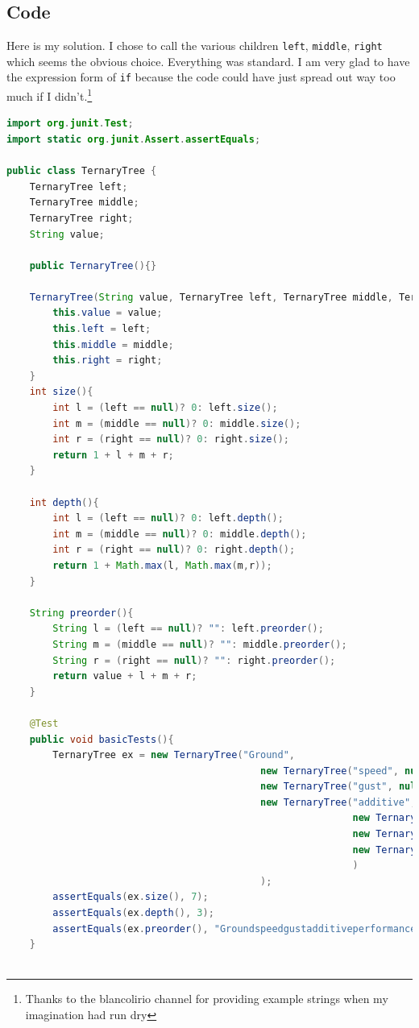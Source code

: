 \documentclass[twoside=false,DIV=14]{scrartcl}
\begin{document}
\subsection{Code}
Here is my solution.  I chose to call the various children \verb+left+, \verb+middle+, \verb+right+ which seems the obvious choice.  Everything was standard.  I am very glad to have the expression form of \verb+if+ because the code could have just spread out way too much if I didn't.\footnote{Thanks to the blancolirio channel for providing example strings when my imagination had run dry}
{\scriptsize
\begin{lstlisting}[language=java]
import org.junit.Test;
import static org.junit.Assert.assertEquals;

public class TernaryTree {
    TernaryTree left;
    TernaryTree middle;
    TernaryTree right;
    String value;

    public TernaryTree(){}

    TernaryTree(String value, TernaryTree left, TernaryTree middle, TernaryTree right){
        this.value = value;
        this.left = left;
        this.middle = middle;
        this.right = right;
    }
    int size(){
        int l = (left == null)? 0: left.size();
        int m = (middle == null)? 0: middle.size();
        int r = (right == null)? 0: right.size();
        return 1 + l + m + r;
    }

    int depth(){
        int l = (left == null)? 0: left.depth();
        int m = (middle == null)? 0: middle.depth();
        int r = (right == null)? 0: right.depth();
        return 1 + Math.max(l, Math.max(m,r));
    }

    String preorder(){
        String l = (left == null)? "": left.preorder();
        String m = (middle == null)? "": middle.preorder();
        String r = (right == null)? "": right.preorder();
        return value + l + m + r;
    }

    @Test
    public void basicTests(){
        TernaryTree ex = new TernaryTree("Ground",
                                            new TernaryTree("speed", null, null, null),
                                            new TernaryTree("gust", null, null, null),
                                            new TernaryTree("additive", 
                                                            new TernaryTree("performance", null, null, null),
                                                            new TernaryTree("back", null, null, null),
                                                            new TernaryTree("idle", null, null, null)
                                                            )
                                            );
        assertEquals(ex.size(), 7);
        assertEquals(ex.depth(), 3);
        assertEquals(ex.preorder(), "Groundspeedgustadditiveperformancebackidle");
    }
    

\end{lstlisting}}
\end{document}
